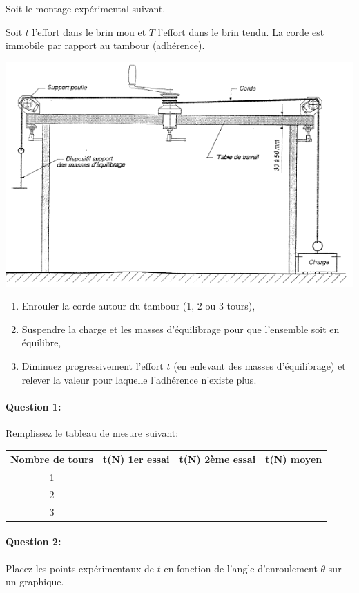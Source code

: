  \begin{minipage}{0.45\linewidth}
Soit le montage expérimental suivant.

Soit $t$ l'effort dans le brin mou et $T$ l'effort dans le brin tendu. La corde est immobile par rapport au tambour (adhérence).
 \end{minipage}
 \hfill
  \begin{minipage}{0.53\linewidth}
   \centering\includegraphics[width=0.9\linewidth]{img/winch_exp.png}
  \end{minipage}

\begin{enumerate}
 \item Enrouler la corde autour du tambour (1, 2 ou 3 tours),
 \item Suspendre la charge et les masses d'équilibrage pour que l'ensemble soit en équilibre,
 \item Diminuez progressivement l'effort $t$ (en enlevant des masses d'équilibrage) et relever la valeur pour laquelle l'adhérence n'existe plus.
\end{enumerate}

\paragraph{Question 1:} Remplissez le tableau de mesure suivant:

\begin{center}
\begin{tabular}{|c|c|c|c|}
\hline
Nombre de tours & t(N) 1er essai & t(N) 2ème essai & t(N) moyen \\
\hline
1 & & & \\
\hline
2 & & & \\
\hline
3 & & & \\
\hline
\end{tabular}
\end{center}

\paragraph{Question 2:} Placez les points expérimentaux de $t$ en fonction de l'angle d'enroulement $\theta$ sur un graphique.




